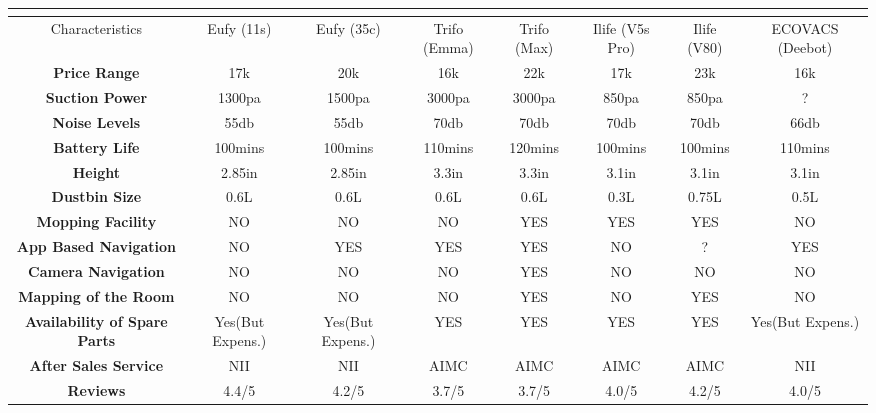 \documentclass[10pt]{article}
\begin{document}
\setlength{\arrayrulewidth}{0.5mm}
\setlength{\tabcolsep}{13pt}
\renewcommand{\arraystretch}{1.5}


\begin{center}
\begin{tabular}{|C|C|C|C|C|C|C|C|}
\hline
\textbf{} \\
\hline
Characteristics & Eufy (11s)&Eufy (35c)&Trifo (Emma) & Trifo (Max)  & Ilife (V5s Pro) & Ilife (V80)  & ECOVACS (Deebot) \\
\hline
\textbf{Price Range} & 17k & 20k & 16k & 22k & 17k & 23k & 16k \\\hline
\textbf{Suction Power}& 1300pa & 1500pa & 3000pa & 3000pa & 850pa & 850pa & ? \\\hline
\textbf{Noise Levels}& 55db & 55db & 70db & 70db & 70db & 70db & 66db\\\hline
\textbf{Battery Life}& 100mins & 100mins & 110mins & 120mins & 100mins & 100mins & 110mins\\\hline
\textbf{Height}&2.85in & 2.85in & 3.3in & 3.3in & 3.1in & 3.1in & 3.1in\\\hline
\textbf{Dustbin Size}&0.6L & 0.6L & 0.6L & 0.6L & 0.3L & 0.75L & 0.5L\\\hline
\textbf{Mopping Facility}&NO & NO & NO & YES & YES & YES & NO\\\hline
\textbf{App Based Navigation}&NO & YES & YES & YES & NO & ?  & YES\\\hline
\textbf{Camera Navigation}&NO & NO & NO & YES & NO & NO & NO\\\hline
\textbf{Mapping of the Room}&NO & NO & NO & YES & NO & YES & NO\\\hline
\textbf{Availability of Spare Parts}&Yes(But Expens.) &Yes(But Expens.) & YES & YES & YES & YES & Yes(But Expens.)\\\hline
\textbf{After Sales Service}&NII &NII &AIMC &AIMC &AIMC &AIMC &NII\\\hline
\textbf{Reviews}&4.4/5 &4.2/5 &3.7/5 &3.7/5 &4.0/5 &4.2/5 &4.0/5\\\hline
\end{tabular}
\end{center}
\end{document}
